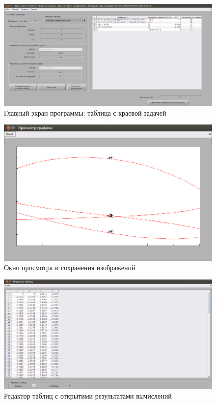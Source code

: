 \begin{figure}[h!] 
\begin{center}
\includegraphics[scale=0.2]{mainWindow_EP.jpeg}
\end{center}
\caption{Главный экран программы: таблица с краевой задачей}
\label{mainWindowPE_pic}
\end{figure}

\begin{figure}[h!] 
\begin{center}
\includegraphics[scale=0.2]{picturesViewer.jpeg}
\end{center}
\caption{Окно просмотра и сохранения изображений}
\label{picViewer_pic}
\end{figure}

\begin{figure}[h!] 
\begin{center}
\includegraphics[scale=0.2]{tableEditor.jpeg}
\end{center}
\caption{Редактор таблиц с открытими результатами вычислений}
\label{tableEditor_pic}
\end{figure}

